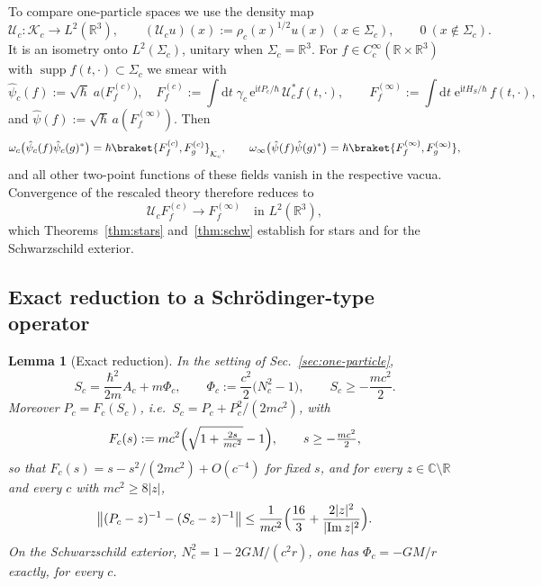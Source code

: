 \documentclass[%
 aip,
 jmp,
 amsmath,amssymb,
 reprint, onecolumn
]{revtex4-1}
\newtheorem{lemma}{Lemma}
\theoremstyle{definition}
\theoremstyle{remark}
\newcommand{\R}{\mathbb{R}}
\newcommand{\C}{\mathbb{C}}
\newcommand{\K}{\mathcal{K}}
\newcommand{\rmd}{\mathrm{d}}
\newcommand{\rmi}{\mathrm{i}}
\newcommand{\rme}{\mathrm{e}}
\DeclareMathOperator{\supp}{supp}
\begin{document}
To compare one-particle spaces we use the density map
\begin{equation}\label{eq:Uc}
\mathcal{U}_c:\K_c\to L^2(\R^3),\qquad (\mathcal{U}_cu)(x):=
\rho_c(x)^{1/2}u(x)\ (x\in\Sigma_c),\qquad 0\ (x\notin\Sigma_c).
\end{equation}
It is an isometry onto $L^2(\Sigma_c)$, unitary when $\Sigma_c=\R^3$.
For $f\in C_c^\infty(\R\times\R^3)$ with $\supp f(t,\cdot)\subset
\Sigma_c$ we smear with
\begin{equation}\label{eq:smeared-vectors}
\hat\psi_c(f):=\sqrt\hbar\;a\bigl(F^{(c)}_f\bigr),\quad
F^{(c)}_f:=\int\rmd t\;\gamma_c\,\rme^{\rmi tP_c/\hbar}\,
\mathcal{U}_c^*f(t,\cdot),\qquad
F^{(\infty)}_f:=\int\rmd t\;\rme^{\rmi tH_S/\hbar}\,f(t,\cdot),
\end{equation}
and $\hat\psi(f):=\sqrt\hbar\,a(F^{(\infty)}_f)$. Then
\begin{equation}\label{eq:two-point}
\omega_c\bigl(\hat\psi_c(f)\hat\psi_c(g)^*\bigr)=\hbar\braket{F_f^{(c)},
F_g^{(c)}}_{\K_c},\qquad
\omega_\infty\bigl(\hat\psi(f)\hat\psi(g)^*\bigr)=\hbar\braket{F_f^{(\infty)},
F_g^{(\infty)}},
\end{equation}
and all other two-point functions of these fields vanish in the
respective vacua. Convergence of the rescaled theory therefore reduces
to
\begin{equation}\label{eq:H2}
\mathcal{U}_cF_f^{(c)}\longrightarrow F_f^{(\infty)}\quad\text{in }
L^2(\R^3),
\end{equation}
which Theorems~\ref{thm:stars} and~\ref{thm:schw} establish for stars
and for the Schwarzschild exterior.

\subsection{Exact reduction to a Schr\"odinger-type operator}
\label{sec:reduction}

\begin{lemma}[Exact reduction]\label{lem:reduction}
In the setting of Sec.~\ref{sec:one-particle},
\begin{equation}\label{eq:Sc}
S_c=\frac{\hbar^2}{2m}A_c+m\Phi_c,\qquad
\Phi_c:=\frac{c^2}{2}\bigl(N_c^2-1\bigr),\qquad
S_c\geq-\frac{mc^2}{2}.
\end{equation}
Moreover $P_c=F_c(S_c)$, i.e.\ $S_c=P_c+P_c^2/(2mc^2)$, with
\begin{equation}\label{eq:Fc}
F_c(s):=mc^2\Bigl(\sqrt{1+\tfrac{2s}{mc^2}}-1\Bigr),\qquad
s\geq-\tfrac{mc^2}{2},
\end{equation}
so that $F_c(s)=s-s^2/(2mc^2)+O(c^{-4})$ for fixed $s$, and for every $z\in\C\setminus\R$ and every $c$ with $mc^2\geq8|z|$,
\begin{equation}\label{eq:reduction-bound}
\bigl\|(P_c-z)^{-1}-(S_c-z)^{-1}\bigr\|\leq
\frac{1}{mc^2}\Bigl(\frac{16}{3}+\frac{2|z|^2}{|\mathrm{Im}\,z|^2}\Bigr).
\end{equation}
On the Schwarzschild exterior, $N_c^2=1-2GM/(c^2r)$, one has
$\Phi_c=-GM/r$ exactly, for every $c$.
\end{lemma}
\end{document}
